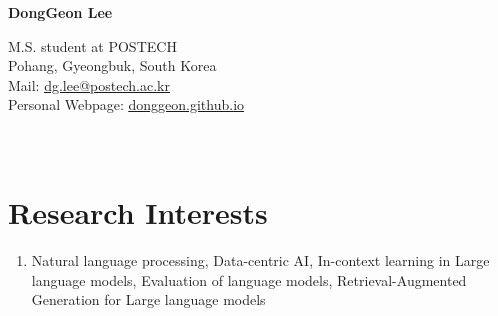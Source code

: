 \documentclass[letterpaper,11pt]{article}
\begin{document}
    \pagestyle{fancy}
    \thispagestyle{fancy}
    
    \begin{center}
        {\LARGE{\bf{DongGeon Lee}}\\}
    \end{center}
    
    \vspace{-14pt}
    
    \begin{center} 
        {M.S. student at POSTECH \\}
        {Pohang, Gyeongbuk, South Korea\\}
        {Mail: \underline{\href{mailto:dg.lee@postech.ac.kr}{dg.lee@postech.ac.kr}} \\}
        {
            Personal Webpage: \underline{\href{https://donggeon.github.io/}{donggeon.github.io}}
        }
    \end{center}

    \section{\\Research Interests}
    \begin{enumerate}[noitemsep, leftmargin=*,label={}]
    \item{Natural language processing, Data-centric AI, In-context learning in Large language models, Evaluation of language models, Retrieval-Augmented Generation for Large language models}
    \end{enumerate}
    
\end{document}
